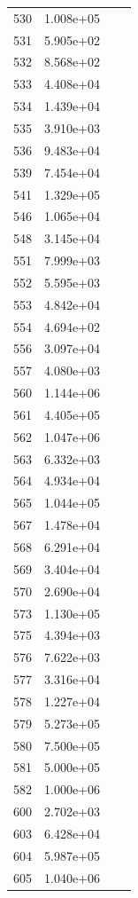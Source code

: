 \documentclass[12pt]{article}
\begin{document}
\begin{longtable}{@{}cccc@{}}
530 & 1.008e+05 &  &  \\
531 & 5.905e+02 &  &  \\
532 & 8.568e+02 &  &  \\
533 & 4.408e+04 &  &  \\
534 & 1.439e+04 &  &  \\
535 & 3.910e+03 &  &  \\
536 & 9.483e+04 &  &  \\
539 & 7.454e+04 &  &  \\
541 & 1.329e+05 &  &  \\
546 & 1.065e+04 &  &  \\
548 & 3.145e+04 &  &  \\
551 & 7.999e+03 &  &  \\
552 & 5.595e+03 &  &  \\
553 & 4.842e+04 &  &  \\
554 & 4.694e+02 &  &  \\
556 & 3.097e+04 &  &  \\
557 & 4.080e+03 &  &  \\
560 & 1.144e+06 &  &  \\
561 & 4.405e+05 &  &  \\
562 & 1.047e+06 &  &  \\
563 & 6.332e+03 &  &  \\
564 & 4.934e+04 &  &  \\
565 & 1.044e+05 &  &  \\
567 & 1.478e+04 &  &  \\
568 & 6.291e+04 &  &  \\
569 & 3.404e+04 &  &  \\
570 & 2.690e+04 &  &  \\
573 & 1.130e+05 &  &  \\
575 & 4.394e+03 &  &  \\
576 & 7.622e+03 &  &  \\
577 & 3.316e+04 &  &  \\
578 & 1.227e+04 &  &  \\
579 & 5.273e+05 &  &  \\
580 & 7.500e+05 &  &  \\
581 & 5.000e+05 &  &  \\
582 & 1.000e+06 &  &  \\
600 & 2.702e+03 &  &  \\
603 & 6.428e+04 &  &  \\
604 & 5.987e+05 &  &  \\
605 & 1.040e+06 &  &  \\

\end{longtable}
\end{document}
